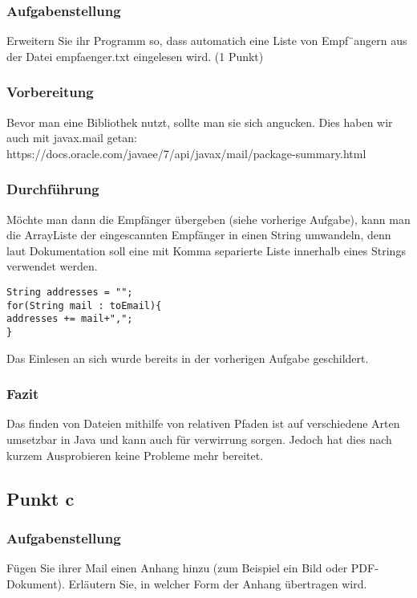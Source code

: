 		\subsubsection{\textbf{Aufgabenstellung}}
		Erweitern Sie ihr Programm so, dass automatich eine Liste von Empf¨angern aus der Datei empfaenger.txt eingelesen wird. (1 Punkt)
		\subsubsection{\textbf{Vorbereitung}}
		Bevor man eine Bibliothek nutzt, sollte man sie sich angucken. Dies haben wir auch mit javax.mail getan: https://docs.oracle.com/javaee/7/api/javax/mail/package-summary.html
		\subsubsection{\textbf{Durchführung}}
		Möchte man dann die Empfänger übergeben (siehe vorherige Aufgabe), kann man die ArrayListe der eingescannten Empfänger in einen String umwandeln, denn laut Dokumentation soll eine mit Komma separierte Liste innerhalb eines Strings verwendet werden.

\begin{lstlisting}
String addresses = "";
for(String mail : toEmail){
addresses += mail+",";
}
\end{lstlisting}


Das Einlesen an sich wurde bereits in der vorherigen Aufgabe geschildert.

		\subsubsection{\textbf{Fazit}}
		Das finden von Dateien mithilfe von relativen Pfaden ist auf verschiedene Arten umsetzbar in Java und kann auch für verwirrung sorgen. Jedoch hat dies nach kurzem Ausprobieren keine Probleme mehr bereitet.
	\subsection{\large Punkt c}
		\subsubsection{\textbf{Aufgabenstellung}}
		Fügen Sie ihrer Mail einen Anhang hinzu (zum Beispiel ein Bild oder PDF-Dokument). Erläutern Sie, in welcher Form der Anhang übertragen wird.
